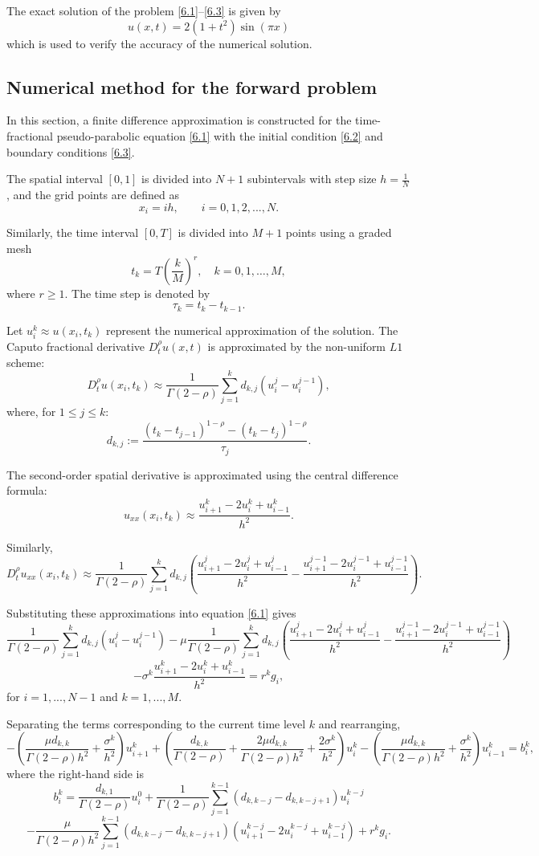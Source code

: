 \documentclass[reqno]{amsart}
\theoremstyle{definition}
\numberwithin{equation}{section}
\begin{document}
The exact solution of the problem \eqref{6.1}–\eqref{6.3} is given by
$$
u(x,t) = 2(1+t^2)\sin(\pi x)
$$
which is used to verify the accuracy of the numerical solution.

\subsection{ Numerical method for the forward problem }  
In this section, a finite difference approximation is constructed for the time-fractional pseudo-parabolic equation \eqref{6.1} with the initial condition \eqref{6.2} and boundary conditions \eqref{6.3}.

The spatial interval $[0,1]$ is divided into $N+1$ subintervals with step size $h=\frac{1}{N}$, and the grid points are defined as
$$
x_i=ih, \qquad i=0,1,2,...,N.
$$

Similarly, the time interval $[0,T]$ is divided into $M+1$ points using a graded mesh
$$
t_k=T\left(\frac{k}{M}\right)^r, \quad k=0,1, \ldots, M,
$$
where $r \ge 1$. The time step is denoted by
$$
\tau_k=t_k-t_{k-1}.
$$

Let $u_i^k \approx u(x_i,t_k)$ represent the numerical approximation of the solution. The Caputo fractional derivative $D_t^{\rho} u(x,t)$ is approximated by the non-uniform $L1$ scheme:
$$
    D_t^{\rho}u(x_i,t_k) \approx \frac{1}{\Gamma(2-\rho)} \sum_{j=1}^k d_{k, j}\left(u_i^j-u_i^{j-1}\right),
$$
where, for $1 \leq j \leq k$:
$$
d_{k, j}:=\frac{\left(t_k-t_{j-1}\right)^{1-\rho}-\left(t_k-t_j\right)^{1-\rho}}{\tau_j} .
$$

The second-order spatial derivative is approximated using the central difference formula:
$$
u_{x x}\left(x_i, t_k\right) \approx \frac{u_{i+1}^k-2 u_i^k+u_{i-1}^k}{h^2} .
$$

Similarly,
$$
D_t^\rho u_{x x}\left(x_i, t_k\right) \approx \frac{1}{\Gamma(2-\rho)} \sum_{j=1}^k d_{k, j}\left(\frac{u_{i+1}^j-2 u_i^j+u_{i-1}^j}{h^2}-\frac{u_{i+1}^{j-1}-2 u_i^{j-1}+u_{i-1}^{j-1}}{h^2}\right) .
$$

Substituting these approximations into equation \eqref{6.1} gives
$$
\frac{1}{\Gamma(2-\rho)} \sum_{j=1}^k d_{k, j}\left(u_i^j-u_i^{j-1}\right)-\mu \frac{1}{\Gamma(2-\rho)} \sum_{j=1}^k d_{k, j}\left(\frac{u_{i+1}^j-2 u_i^j+u_{i-1}^j}{h^2}-\frac{u_{i+1}^{j-1}-2 u_i^{j-1}+u_{i-1}^{j-1}}{h^2}\right)
$$
$$
-\sigma^k \frac{u_{i+1}^k-2 u_i^k+u_{i-1}^k}{h^2}=r^k g_i,
$$
for $i=1, ... ,N-1$ and $k=1, ... ,M$.

Separating the terms corresponding to the current time level $k$ and rearranging,
$$
-\left(\frac{\mu d_{k, k}}{\Gamma(2-\rho) h^2}+\frac{\sigma^k}{h^2}\right) u_{i+1}^k +\left(\frac{d_{k, k}}{\Gamma(2-\rho)}+\frac{2 \mu d_{k, k}}{\Gamma(2-\rho) h^2}+\frac{2 \sigma^k}{h^2}\right) u_i^k-\left(\frac{\mu d_{k, k}}{\Gamma(2-\rho) h^2}+\frac{\sigma^k}{h^2}\right) u_{i-1}^k=b_i^k,
$$
where the right-hand side is
$$
b_i^k=\frac{d_{k, 1}}{\Gamma(2-\rho)} u_i^0+\frac{1}{\Gamma(2-\rho)} \sum_{j=1}^{k-1}\left(d_{k, k-j}-d_{k, k-j+1}\right) u_i^{k-j}
$$
$$
-\frac{\mu}{\Gamma(2-\rho) h^2} \sum_{j=1}^{k-1}\left(d_{k, k-j}-d_{k, k-j+1}\right)\left(u_{i+1}^{k-j}-2 u_i^{k-j}+u_{i-1}^{k-j}\right)+r^k g_i.
$$
\end{document}
